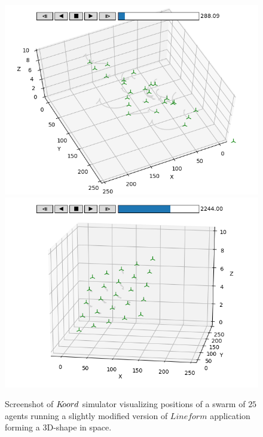 \begin{figure}[h!]
\begin{minipage}{0.5\textwidth}
\includegraphics[width=.5\textwidth]{figs/formation1.png}\hfill
\includegraphics[width=.5\textwidth]{figs/formation4.png}\hfill%
\end{minipage}%
\caption{Screenshot of $K\kern-2pt oord$ simulator visualizing positions of a swarm of $25$ agents running a slightly modified version of $\mathit{Lineform}$ application forming a 3D-shape in space.}
\label{fig:shapeplots}
\end{figure}











